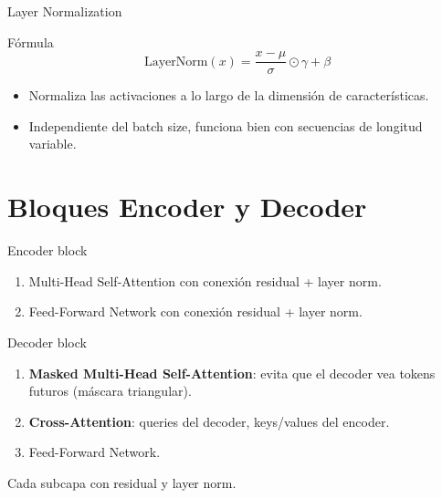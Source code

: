 \documentclass[aspectratio=169, 10pt, xcolor=table]{beamer}
\begin{document}
\begin{frame}{Layer Normalization}
    \begin{block}{Fórmula}
        \[
        \text{LayerNorm}(x) = \frac{x - \mu}{\sigma} \odot \gamma + \beta
        \]
    \end{block}
    \begin{itemize}
        \item Normaliza las activaciones a lo largo de la dimensión de características.
        \item Independiente del batch size, funciona bien con secuencias de longitud variable.
    \end{itemize}
\end{frame}

\section{Bloques Encoder y Decoder}

\begin{frame}{Encoder block}
    \begin{enumerate}
        \item Multi-Head Self-Attention con conexión residual + layer norm.
        \item Feed-Forward Network con conexión residual + layer norm.
    \end{enumerate}
\end{frame}

\begin{frame}{Decoder block}
    \begin{enumerate}
        \item \textbf{Masked Multi-Head Self-Attention}: evita que el decoder vea tokens futuros (máscara triangular).
        \item \textbf{Cross-Attention}: queries del decoder, keys/values del encoder.
        \item Feed-Forward Network.
    \end{enumerate}
    Cada subcapa con residual y layer norm.
\end{frame}

\end{document}

